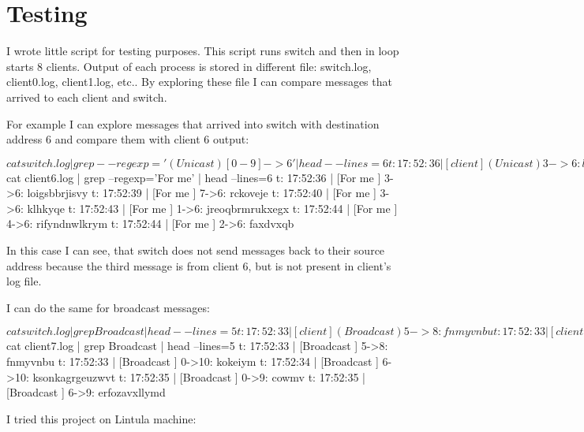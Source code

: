 \documentclass[11pt,a4paper,titlepage]{article}
\begin{document}
\section{Testing}
I wrote little script for testing purposes. This script runs switch and then in loop starts 8 clients. Output of each process is stored in different file: switch.log, client0.log, client1.log, etc.. By exploring these file I can compare messages that arrived to each client and switch.


For example I can explore messages that arrived into switch with destination address 6 and compare them with client 6 output:
\begin{bashcode}
$ cat switch.log | grep --regexp='(Unicast) [0-9]->6' | head --lines=6
t: 17:52:36 | [client] (Unicast) 3->6: loigsbbrjisvy
t: 17:52:39 | [client] (Unicast) 7->6: rckoveje
t: 17:52:40 | [client] (Unicast) 6->6: qhtfwyygvfj
t: 17:52:40 | [client] (Unicast) 3->6: klhkyqe
t: 17:52:43 | [client] (Unicast) 1->6: jreoqbrmrukxegx
t: 17:52:44 | [client] (Unicast) 4->6: rifyndnwlkrym

$ cat client6.log | grep --regexp='For me' | head --lines=6
t: 17:52:36 | [For me    ] 3->6: loigsbbrjisvy
t: 17:52:39 | [For me    ] 7->6: rckoveje
t: 17:52:40 | [For me    ] 3->6: klhkyqe
t: 17:52:43 | [For me    ] 1->6: jreoqbrmrukxegx
t: 17:52:44 | [For me    ] 4->6: rifyndnwlkrym
t: 17:52:44 | [For me    ] 2->6: faxdvxqb
\end{bashcode}
In this case I can see, that switch does not send messages back to their source address because the third message is from client 6, but is not present in client's log file.

I can do the same for broadcast messages:
\begin{bashcode}
$ cat switch.log | grep Broadcast | head --lines=5
t: 17:52:33 | [client] (Broadcast) 5->8: fnmyvnbu
t: 17:52:33 | [client] (Broadcast) 0->10: kokeiym
t: 17:52:34 | [client] (Broadcast) 6->10: ksonkagrgeuzwvt
t: 17:52:35 | [client] (Broadcast) 0->9: cowmv
t: 17:52:35 | [client] (Broadcast) 6->9: erfozavxllymd

$ cat client7.log | grep Broadcast | head --lines=5
t: 17:52:33 | [Broadcast ] 5->8: fnmyvnbu
t: 17:52:33 | [Broadcast ] 0->10: kokeiym
t: 17:52:34 | [Broadcast ] 6->10: ksonkagrgeuzwvt
t: 17:52:35 | [Broadcast ] 0->9: cowmv
t: 17:52:35 | [Broadcast ] 6->9: erfozavxllymd
\end{bashcode}

I tried this project on Lintula machine:
\end{document}
